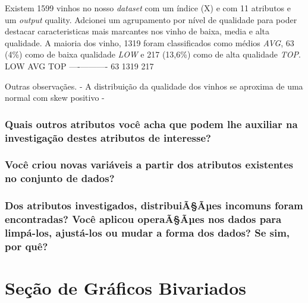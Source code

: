 \documentclass[]{article}
\begin{document}
Existem 1599 vinhos no nosso \emph{dataset} com um índice (X) e com 11
atributos e um \emph{output} quality. Adcionei um agrupamento por nível
de qualidade para poder destacar caracteristicas mais marcantes nos
vinho de baixa, media e alta qualidade. A maioria dos vinho, 1319 foram
classificados como médios \emph{AVG}, 63 (4\%) como de baixa qualidade
\emph{LOW} e 217 (13,6\%) como de alta qualidade \emph{TOP}. LOW
\textbar{} AVG \textbar{} TOP ----\textbar{}------\textbar{}---- 63
\textbar{} 1319 \textbar{} 217

Outras observaçães. - A distribuição da qualidade dos vinhos se aproxima
de uma normal com skew positivo -

\hypertarget{quais-outros-atributos-voce-acha-que-podem-lhe-auxiliar-na-investigacao-destes-atributos-de-interesse}{%
\subsubsection{Quais outros atributos você acha que podem lhe auxiliar
na investigação destes atributos de
interesse?}\label{quais-outros-atributos-voce-acha-que-podem-lhe-auxiliar-na-investigacao-destes-atributos-de-interesse}}

\hypertarget{voce-criou-novas-variaveis-a-partir-dos-atributos-existentes-no-conjunto-de-dados}{%
\subsubsection{Você criou novas variáveis a partir dos atributos
existentes no conjunto de
dados?}\label{voce-criou-novas-variaveis-a-partir-dos-atributos-existentes-no-conjunto-de-dados}}

\hypertarget{dos-atributos-investigados-distribuiaaes-incomuns-foram-encontradas-voce-aplicou-operaaaes-nos-dados-para-limpa-los-ajusta-los-ou-mudar-a-forma-dos-dados-se-sim-por-que}{%
\subsubsection{Dos atributos investigados, distribuiÃ§Ãµes incomuns
foram encontradas? Você aplicou operaÃ§Ãµes nos dados para limpá-los,
ajustá-los ou mudar a forma dos dados? Se sim, por
quê?}\label{dos-atributos-investigados-distribuiaaes-incomuns-foram-encontradas-voce-aplicou-operaaaes-nos-dados-para-limpa-los-ajusta-los-ou-mudar-a-forma-dos-dados-se-sim-por-que}}

\hypertarget{secao-de-graficos-bivariados}{%
\section{Seção de Gráficos
Bivariados}\label{secao-de-graficos-bivariados}}
\end{document}
